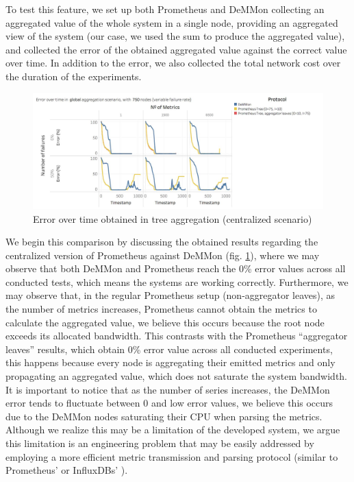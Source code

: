 To test this feature, we set up both Prometheus and DeMMon collecting an aggregated value of the whole system in a single node, providing an aggregated view of the system (our case, we used the sum to produce the aggregated value), and collected the error of the obtained aggregated value against the correct value over time. In addition to the error, we also collected the total network cost over the duration of the experiments. 

\begin{figure}
    \centering
    \includegraphics[width=\linewidth]{Chapters/evaluation/figures/aggregation/Error_over_time_global_tree.jpg}
    \caption{Error over time obtained in tree aggregation (centralized scenario)}
    \label{fig:sec:mon_eval_tree_centralized}
\end{figure}

We begin this comparison by discussing the obtained results regarding the centralized version of Prometheus against DeMMon (fig. \ref{fig:sec:mon_eval_tree_centralized}), where we may observe that both DeMMon and Prometheus reach the 0\% error values across all conducted tests, which means the systems are working correctly. Furthermore, we may observe that, in the regular Prometheus setup (non-aggregator leaves), as the number of metrics increases, Prometheus cannot obtain the metrics to calculate the aggregated value, we believe this occurs because the root node exceeds its allocated bandwidth. This contrasts with the Prometheus ``aggregator leaves'' results, which obtain 0\% error value across all conducted experiments, this happens because every node is aggregating their emitted metrics and only propagating an aggregated value, which does not saturate the system bandwidth. It is important to notice that as the number of series increases, the DeMMon error tends to fluctuate between 0 and low error values, we believe this occurs due to the DeMMon nodes saturating their CPU when parsing the metrics. Although we realize this may be a limitation of the developed system, we argue this limitation is an engineering problem that may be easily addressed by employing a more efficient metric transmission and parsing protocol (similar to Prometheus' or InfluxDBs' \cite{influxdb_data_elements}).

